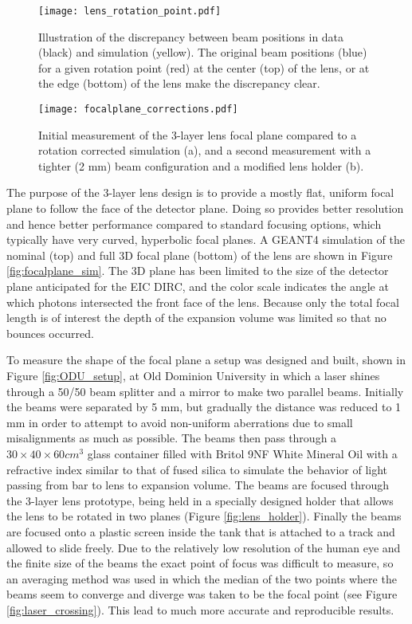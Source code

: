 \begin{figure}[!htb]
	\centering
	\texttt{[image: lens\_rotation\_point.pdf]}
	\caption[Illustration of the discrepancy between beam positions in data (black) and simulation (yellow).]{Illustration of the discrepancy between beam positions in data (black) and simulation (yellow). The original beam positions (blue) for a given rotation point (red) at the center (top) of the lens, or at the edge (bottom) of the lens make the discrepancy clear.}
	\label{fig:lens_rotation_point}
\end{figure}

\begin{figure}[!htb]
	\centering
	\texttt{[image: focalplane\_corrections.pdf]}
	\caption{Initial measurement of the 3-layer lens focal plane compared to a rotation corrected simulation (a), and a second measurement with a tighter (2 mm) beam configuration and a modified lens holder (b).}
	\label{fig:focalplane_corrections}
\end{figure}

The purpose of the 3-layer lens design is to provide a mostly flat, uniform focal plane to follow the face of the detector plane. Doing so provides better resolution and hence better performance compared to standard focusing options, which typically have very curved, hyperbolic focal planes. A GEANT4 simulation of the nominal (top) and full 3D focal plane (bottom) of the lens are shown in Figure \ref{fig:focalplane_sim}. The 3D plane has been limited to the size of the detector plane anticipated for the EIC DIRC, and the color scale indicates the angle at which photons intersected the front face of the lens. Because only the total focal length is of interest the depth of the expansion volume was limited so that no bounces occurred.

To measure the shape of the focal plane a setup was designed and built, shown in Figure \ref{fig:ODU_setup}, at Old Dominion University in which a laser shines through a 50/50 beam splitter and a mirror to make two parallel beams. Initially the beams were separated by 5 mm, but gradually the distance was reduced to 1 mm in order to attempt to avoid non-uniform aberrations due to small misalignments as much as possible. The beams then pass through a $30\times40\times60\unit{cm}^3$ glass container filled with Britol 9NF White Mineral Oil \cite{BritolOil} with a refractive index similar to that of fused silica to simulate the behavior of light passing from bar to lens to expansion volume. The beams are focused through the 3-layer lens prototype, being held in a specially designed holder that allows the lens to be rotated in two planes (Figure \ref{fig:lens_holder}). Finally the beams are focused onto a plastic screen inside the tank that is attached to a track and allowed to slide freely. Due to the relatively low resolution of the human eye and the finite size of the beams the exact point of focus was difficult to measure, so an averaging method was used in which the median of the two points where the beams seem to converge and diverge was taken to be the focal point (see Figure \ref{fig:laser_crossing}). This lead to much more accurate and reproducible results.

